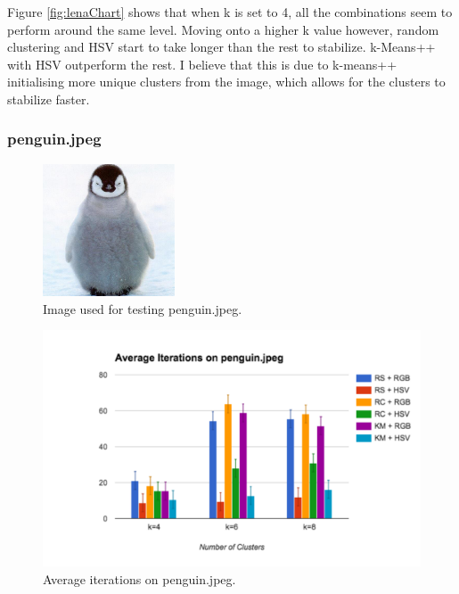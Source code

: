 \documentclass{article}
\begin{document}
Figure \ref{fig:lenaChart} shows that when k is set to 4, all the combinations
seem to perform around the same level. Moving onto a higher k value however,
random clustering and HSV start to take longer than the rest to
stabilize. k-Means++ with HSV outperform the rest. I believe that this is due to
k-means++ initialising more unique clusters from the image, which allows for the
clusters to stabilize faster.

\subsubsection{penguin.jpeg}

\begin{figure}[ht]
\begin{center}
\includegraphics[width=0.35\textwidth]{images/penguin}
\caption{Image used for testing penguin.jpeg.}
\label{fig:penguinTest}
\end{center}
\end{figure}

\begin{figure}[ht]
\begin{center}
\includegraphics[width=1\textwidth]{images/penguinChart}
\caption{Average iterations on penguin.jpeg.}
\label{fig:penguinChart}
\end{center}
\end{figure}
\end{document}
